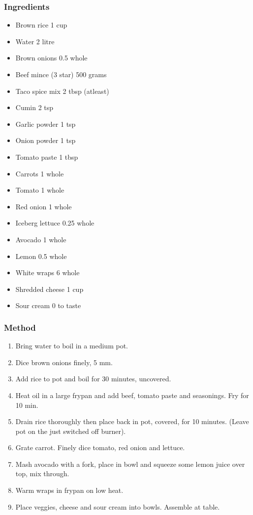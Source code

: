 \documentclass[]{article}
\begin{document}
\subsubsection*{\Large Ingredients}
\begin{multicols}{2}
\begin{itemize}
 \item Brown rice \hfill 1 cup
 \item Water \hfill 2 litre
 \item Brown onions \hfill 0.5 whole
 \item Beef mince (3 star) \hfill 500 grams
 \item Taco spice mix \hfill 2 tbsp (atleast)
 \item Cumin \hfill 2 tsp
 \item Garlic powder \hfill 1 tsp
 \item Onion powder \hfill 1 tsp
 \item Tomato paste \hfill 1 tbsp
 \item Carrots \hfill 1 whole
 \item Tomato \hfill 1 whole
 \item Red onion \hfill 1 whole
 \item Iceberg lettuce \hfill 0.25 whole
 \item Avocado \hfill 1 whole
 \item Lemon \hfill 0.5 whole
 \item White wraps \hfill 6 whole
 \item Shredded cheese \hfill 1 cup
 \item Sour cream \hfill 0 to taste
\end{itemize}
\end{multicols}
\subsubsection*{\Large Method}
\begin{enumerate}[font=\huge\color{accent}]
	\item Bring water to boil in a medium pot.
	\item Dice brown onions finely, 5 mm.
	\item Add rice to pot and boil for 30 minutes, uncovered.
	\item Heat oil in a large frypan and add beef, tomato paste and seasonings. Fry for 10 min.
	\item Drain rice thoroughly then place back in pot, covered, for 10 minutes. (Leave pot on the just switched off burner).
	\item Grate carrot. Finely dice tomato, red onion and lettuce.
	\item Mash avocado with a fork, place in bowl and squeeze some lemon juice over top, mix through.
	\item Warm wraps in frypan on low heat.
	\item Place veggies, cheese and sour cream into bowls. Assemble at table.
\end{enumerate}
\newpage
{}\label{rec:Chicken Shawarma}
\end{document}
